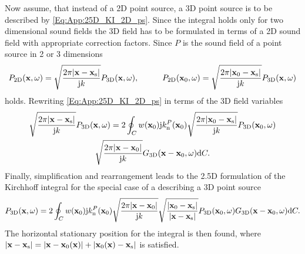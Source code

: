 Now assume, that instead of a 2D point source, a 3D point source is to be described by \eqref{Eq:App:25D_KI_2D_ps}.
Since the integral holds only for two dimensional sound fields the 3D field has to be formulated in terms of a 2D sound field with appropriate correction factors.
Since $P$ is the sound field of a point source in 2 or 3 dimensions 
\begin{equation}
P_{2\text{D}}(\mathbf{x},\omega) = \sqrt{\frac{2 \pi |\mathbf{x}-\mathbf{x}_{\mathrm{s}}|}{\mathrm{j} k }} P_{3\text{D}}(\mathbf{x},\omega), \hspace{1cm}
P_{2\text{D}}(\mathbf{x}_0,\omega) = \sqrt{\frac{2 \pi |\mathbf{x}_0-\mathbf{x}_{\mathrm{s}}|}{\mathrm{j} k }} P_{3\text{D}}(\mathbf{x},\omega)
\end{equation} 
holds.
Rewriting \eqref{Eq:App:25D_KI_2D_ps} in terms of the 3D field variables
\begin{multline}
\sqrt{\frac{2 \pi |\mathbf{x}-\mathbf{x}_{\mathrm{s}}|}{\mathrm{j} k }} P_{3\text{D}}(\mathbf{x},\omega) = 2 \oint_C w(\mathbf{x}_0) \mathrm{j} k_{\mathrm{n}}^P(\mathbf{x}_0) \sqrt{\frac{2 \pi |\mathbf{x}_0-\mathbf{x}_{\mathrm{s}}|}{\mathrm{j} k }} P_{3\text{D}}(\mathbf{x}_0,\omega) \\
  \sqrt{\frac{2 \pi |\mathbf{x}-\mathbf{x}_0|}{\mathrm{j} k }}G_{3\text{D}}(\mathbf{x}-\mathbf{x}_0,\omega) \mathrm{d} C.
\end{multline}
Finally, simplification and rearrangement leads to the 2.5D formulation of the Kirchhoff integral for the special case of a describing a 3D point source
\begin{equation}
P_{3\text{D}}(\mathbf{x},\omega) = 2 \oint_C w(\mathbf{x}_0) \mathrm{j} k_{\mathrm{n}}^P(\mathbf{x}_0) \sqrt{\frac{2 \pi |\mathbf{x}-\mathbf{x}_0|}{\mathrm{j} k }} \sqrt{ \frac{|\mathbf{x}_0-\mathbf{x}_{\mathrm{s}}|}{|\mathbf{x}-\mathbf{x}_{\mathrm{s}}|}} P_{3\text{D}}(\mathbf{x}_0,\omega) 
 G_{3\text{D}}(\mathbf{x}-\mathbf{x}_0,\omega) \mathrm{d} C.
\end{equation}
The horizontal stationary position for the integral is then found, where $|\mathbf{x}-\mathbf{x}_{\mathrm{s}}| = |\mathbf{x} - \mathbf{x}_0(\mathbf{x})| + |\mathbf{x}_0(\mathbf{x})-\mathbf{x}_{\mathrm{s}}|$ is satisfied.
